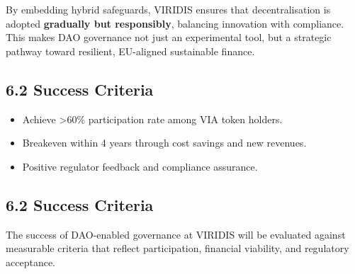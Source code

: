 \documentclass[
  english,
  12pt,
  oneside,
  open=any]{scrbook}
\providecommand{\tightlist}{%
  \setlength{\itemsep}{0pt}\setlength{\parskip}{0pt}}\usepackage{longtable,booktabs,array}
\begin{document}
By embedding hybrid safeguards, VIRIDIS ensures that decentralisation is
adopted \textbf{gradually but responsibly}, balancing innovation with
compliance. This makes DAO governance not just an experimental tool, but
a strategic pathway toward resilient, EU-aligned sustainable finance.

\subsection{6.2 Success Criteria}\label{success-criteria}

\begin{itemize}
\tightlist
\item
  Achieve \textgreater60\% participation rate among VIA token holders.
\item
  Breakeven within 4 years through cost savings and new revenues.
\item
  Positive regulator feedback and compliance assurance.
\end{itemize}

\subsection{6.2 Success Criteria}\label{sec-success}

The success of DAO-enabled governance at VIRIDIS will be evaluated
against measurable criteria that reflect participation, financial
viability, and regulatory acceptance.
\end{document}

